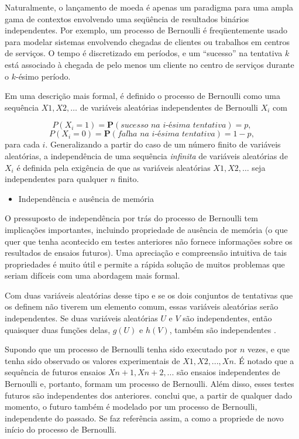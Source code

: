 Naturalmente, o lançamento de moeda é apenas um paradigma para uma ampla gama de contextos envolvendo uma seqüência de resultados binários independentes. Por exemplo, um processo de Bernoulli é freqüentemente usado para modelar sistemas envolvendo chegadas de clientes ou trabalhos em centros de serviços. O tempo é discretizado em períodos, e um “sucesso” na tentativa $k$ está associado à chegada de pelo menos um cliente no centro de serviços durante o $k$-ésimo período.

Em uma descrição mais formal, é definido o processo de Bernoulli como uma sequência $X1, X2, \dots$ de variáveis aleatórias independentes de Bernoulli $X_{i}$ com

$$P(X_{i} = 1) = \textbf{P}(\textit{sucesso na i-ésima tentativa}) = p, $$
$$P(X_{i} = 0) = \textbf{P}(\textit{falha na i-ésima tentativa}) = 1-p, $$
%
para cada $i$. Generalizando a partir do caso de um número finito de variáveis aleatórias, a independência de uma sequência \textit{infinita} de variáveis aleatórias de $X_i$ é definida pela exigência de que as variáveis aleatórias $X1, X2, \dots$ seja independentes para qualquer $n$ finito.


\begin{itemize}
	\item Independência e ausência de memória
\end{itemize}

O pressuposto de independência por trás do processo de Bernoulli tem implicações importantes, incluindo propriedade de ausência de memória (o que quer que tenha acontecido em testes anteriores não fornece informações sobre os resultados de ensaios futuros). Uma apreciação e compreensão intuitiva de tais propriedades é muito útil e permite a rápida solução de muitos problemas que seriam difíceis com uma abordagem mais formal.

Com duas variáveis aleatórias desse tipo e se os dois conjuntos de tentativas que os definem não tiverem um elemento comum, essas variáveis aleatórias serão independentes. Se duas variáveis aleatórias $U$ e $V$ são independentes, então quaisquer duas funções delas, $g(U)$ e $h(V)$, também são independentes \cite{bertsekas2008}.

Supondo que um processo de Bernoulli tenha sido executado por $n$ vezes, e que tenha sido observado os valores experimentais de $X1, X2, ..., Xn$. É notado que a sequência de futuros ensaios $Xn + 1, Xn + 2, ...$ são ensaios independentes de Bernoulli e, portanto, formam um processo de Bernoulli. Além disso, esses testes futuros são independentes dos anteriores. \cite{bertsekas2008} conclui que, a partir de qualquer dado momento, o futuro também é modelado por um processo de Bernoulli, independente do passado. Se faz referência assim, a como a propriede de novo início do processo de Bernoulli.


